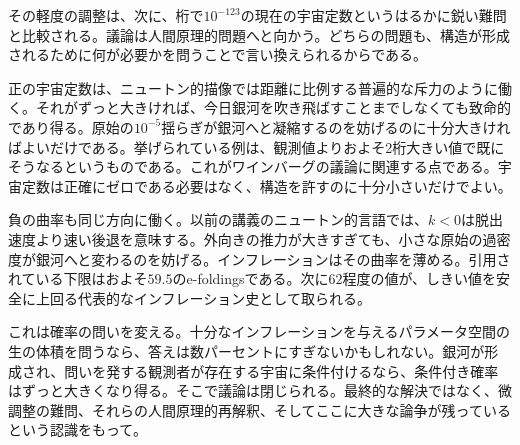 \begin{classroomqa}
\end{classroomqa}

その軽度の調整は、次に、桁で\(10^{-123}\)の現在の宇宙定数というはるかに鋭い難問と比較される。議論は人間原理的問題へと向かう。どちらの問題も、構造が形成されるために何が必要かを問うことで言い換えられるからである。

正の宇宙定数は、ニュートン的描像では距離に比例する普遍的な斥力のように働く。それがずっと大きければ、今日銀河を吹き飛ばすことまでしなくても致命的であり得る。原始の\(10^{-5}\)揺らぎが銀河へと凝縮するのを妨げるのに十分大きければよいだけである。挙げられている例は、観測値よりおよそ2桁大きい値で既にそうなるというものである。これがワインバーグの議論に関連する点である。宇宙定数は正確にゼロである必要はなく、構造を許すのに十分小さいだけでよい。

負の曲率も同じ方向に働く。以前の講義のニュートン的言語では、\(k<0\)は脱出速度より速い後退を意味する。外向きの推力が大きすぎても、小さな原始の過密度が銀河へと変わるのを妨げる。インフレーションはその曲率を薄める。引用されている下限はおよそ\(59.5\)のe-foldingsである。次に\(62\)程度の値が、しきい値を安全に上回る代表的なインフレーション史として取られる。

これは確率の問いを変える。十分なインフレーションを与えるパラメータ空間の生の体積を問うなら、答えは数パーセントにすぎないかもしれない。銀河が形成され、問いを発する観測者が存在する宇宙に条件付けるなら、条件付き確率はずっと大きくなり得る。そこで議論は閉じられる。最終的な解決ではなく、微調整の難問、それらの人間原理的再解釈、そしてここに大きな論争が残っているという認識をもって。